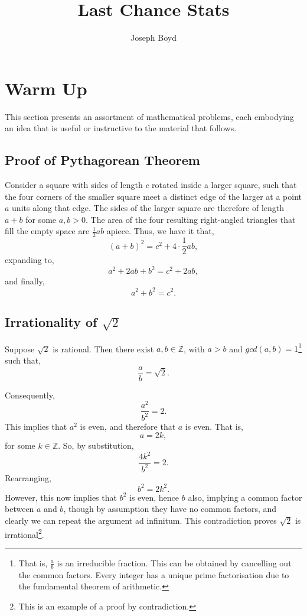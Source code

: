 \documentclass[11pt]{amsart}
\title{Last Chance Stats}
\author{Joseph Boyd}
\begin{document}
\maketitle

\tableofcontents

\pagebreak

\section{Warm Up}

This section presents an assortment of mathematical problems, each embodying an idea that is useful or instructive to the material that follows.

\subsection{Proof of Pythagorean Theorem}

Consider a square with sides of length $c$ rotated inside a larger square, such that the four corners of the smaller square meet a distinct edge of the larger at a point $a$ units along that edge. The sides of the larger square are therefore of length $a + b$ for some $a, b > 0$. The area of the four resulting right-angled triangles that fill the empty space are $\frac{1}{2}ab$ apiece. Thus, we have it that, $$(a + b)^2 = c^2 + 4 \cdot \frac{1}{2}ab,$$ expanding to, $$a^2 + 2ab + b^2 = c^2 + 2ab,$$ and finally, $$a^2 + b^2 = c^2.$$

\subsection{Irrationality of $\sqrt{2}$}

Suppose $\sqrt{2}$ is rational. Then there exist $a, b \in \mathbb{Z}$, with $a > b$ and $gcd(a, b) = 1$\footnote{That is, $\frac{a}{b}$ is an irreducible fraction. This can be obtained by cancelling out the common factors. Every integer has a unique prime factorisation due to the fundamental theorem of arithmetic.} such that, $$\frac{a}{b} = \sqrt{2}.$$

Consequently, $$\frac{a^2}{b^2} = 2.$$ This implies that $a^2$ is even, and therefore that $a$ is even. That is, $$a = 2k,$$ for some $k \in \mathbb{Z}$. So, by substitution, $$\frac{4k^2}{b^2} = 2.$$ Rearranging, $$b^2 = 2k^2.$$ However, this now implies that $b^2$ is even, hence $b$ also, implying a common factor between $a$ and $b$, though by assumption they have no common factors, and clearly we can repeat the argument ad infinitum. This contradiction proves $\sqrt{2}$ is irrational\footnote{This is an example of a proof by contradiction.}.
\end{document}
